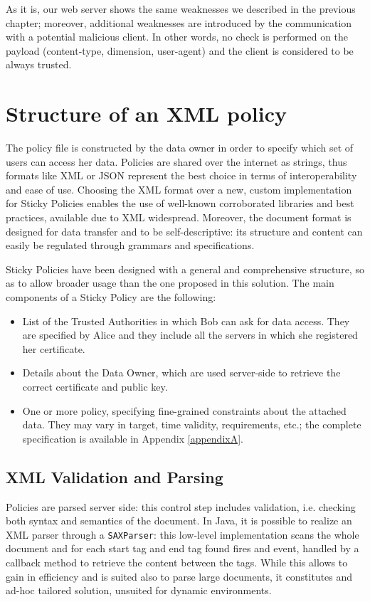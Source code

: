 As it is, our web server shows the same weaknesses we described in the previous chapter; moreover, additional weaknesses are introduced by the communication with a potential malicious client. In other words, no check is performed on the payload (content-type, dimension, user-agent) and the client is considered to be always trusted.

\section{Structure of an XML policy}
The policy file is constructed by the data owner in order to specify which set of users can access her data. Policies are shared over the internet as strings, thus formats like XML or JSON represent the best choice in terms of interoperability and ease of use. Choosing the XML format over a new, custom implementation for Sticky Policies enables the use of well-known corroborated libraries and best practices, available due to XML widespread. Moreover, the document format is designed for data transfer and to be self-descriptive: its structure and content can easily be regulated through grammars and specifications.

Sticky Policies have been designed with a general and comprehensive structure, so as to allow broader usage than the one proposed in this solution. The main components of a Sticky Policy are the following:
\begin{itemize}
	\item List of the Trusted Authorities in which Bob can ask for data access. They are specified by Alice and they include all the servers in which she registered her certificate.
	\item Details about the Data Owner, which are used server-side to retrieve the correct certificate and public key.
	\item One or more policy, specifying fine-grained constraints about the attached data. They may vary in target, time validity, requirements, etc.; the complete specification is available in Appendix \ref{appendixA}.
\end{itemize}

\subsection{XML Validation and Parsing}
Policies are parsed server side: this control step includes validation, i.e. checking both syntax and semantics of the document. In Java, it is possible to realize an XML parser through a \texttt{SAXParser}: this low-level implementation scans the whole document and for each start tag and end tag found fires and event, handled by a callback method to retrieve the content between the tags. While this allows to gain in efficiency and is suited also to parse large documents, it constitutes and ad-hoc tailored solution, unsuited for dynamic environments.

